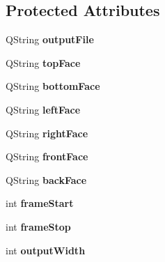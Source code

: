 \subsection*{\-Protected \-Attributes}
\begin{DoxyCompactItemize}
\item 
\hypertarget{class_j_son_i_o_a39cb18a75f4bd012d60848965d0785b3}{
\-Q\-String {\bfseries output\-File}}
\label{class_j_son_i_o_a39cb18a75f4bd012d60848965d0785b3}

\item 
\hypertarget{class_j_son_i_o_a9f0184dfacd46ed4e0890b95827e6bd2}{
\-Q\-String {\bfseries top\-Face}}
\label{class_j_son_i_o_a9f0184dfacd46ed4e0890b95827e6bd2}

\item 
\hypertarget{class_j_son_i_o_a59d216a0309cacf53b1c68c90eda9555}{
\-Q\-String {\bfseries bottom\-Face}}
\label{class_j_son_i_o_a59d216a0309cacf53b1c68c90eda9555}

\item 
\hypertarget{class_j_son_i_o_ac33f3ca7a3953ecea03664b65e1cbde5}{
\-Q\-String {\bfseries left\-Face}}
\label{class_j_son_i_o_ac33f3ca7a3953ecea03664b65e1cbde5}

\item 
\hypertarget{class_j_son_i_o_ab3875c5e1c7e9469c7119073c65e055d}{
\-Q\-String {\bfseries right\-Face}}
\label{class_j_son_i_o_ab3875c5e1c7e9469c7119073c65e055d}

\item 
\hypertarget{class_j_son_i_o_a43962b172d75a81ef396b1fc85bc045c}{
\-Q\-String {\bfseries front\-Face}}
\label{class_j_son_i_o_a43962b172d75a81ef396b1fc85bc045c}

\item 
\hypertarget{class_j_son_i_o_a01cf59d9e57ef4175d2bbec6745d8bad}{
\-Q\-String {\bfseries back\-Face}}
\label{class_j_son_i_o_a01cf59d9e57ef4175d2bbec6745d8bad}

\item 
\hypertarget{class_j_son_i_o_a9a30df788d4dc61f9ddb820aba51f3d2}{
int {\bfseries frame\-Start}}
\label{class_j_son_i_o_a9a30df788d4dc61f9ddb820aba51f3d2}

\item 
\hypertarget{class_j_son_i_o_a6036c974a4d08d06610d173c08e5ddb5}{
int {\bfseries frame\-Stop}}
\label{class_j_son_i_o_a6036c974a4d08d06610d173c08e5ddb5}

\item 
\hypertarget{class_j_son_i_o_a638cd6d4eeeb75d17c95b22b9d6b94ac}{
int {\bfseries output\-Width}}
\label{class_j_son_i_o_a638cd6d4eeeb75d17c95b22b9d6b94ac}


\end{DoxyCompactItemize}

